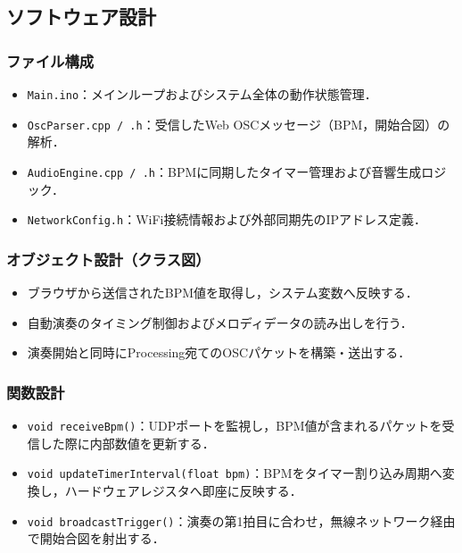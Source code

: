 \documentclass[uplatex,dvipdfmx]{jsarticle}
\begin{document}
\subsection{\textbf{ソフトウェア設計}}

\subsubsection{\textbf{ファイル構成}}
\begin{itemize}
\item \texttt{Main.ino}：メインループおよびシステム全体の動作状態管理．
\item \texttt{OscParser.cpp / .h}：受信したWeb OSCメッセージ（BPM，開始合図）の解析．
\item \texttt{AudioEngine.cpp / .h}：BPMに同期したタイマー管理および音響生成ロジック．
\item \texttt{NetworkConfig.h}：WiFi接続情報および外部同期先のIPアドレス定義．
\end{itemize}

\subsubsection{\textbf{オブジェクト設計（クラス図）}}
\begin{itemize}
\item {} ブラウザから送信されたBPM値を取得し，システム変数へ反映する．
\item {} 自動演奏のタイミング制御およびメロディデータの読み出しを行う．
\item {} 演奏開始と同時にProcessing宛てのOSCパケットを構築・送出する．
\end{itemize}

\subsubsection{\textbf{関数設計}}
\begin{itemize}
\item \texttt{void receiveBpm()}：UDPポートを監視し，BPM値が含まれるパケットを受信した際に内部数値を更新する．
\item \texttt{void updateTimerInterval(float bpm)}：BPMをタイマー割り込み周期へ変換し，ハードウェアレジスタへ即座に反映する．
\item \texttt{void broadcastTrigger()}：演奏の第1拍目に合わせ，無線ネットワーク経由で開始合図を射出する．
\end{itemize}
\end{document}
